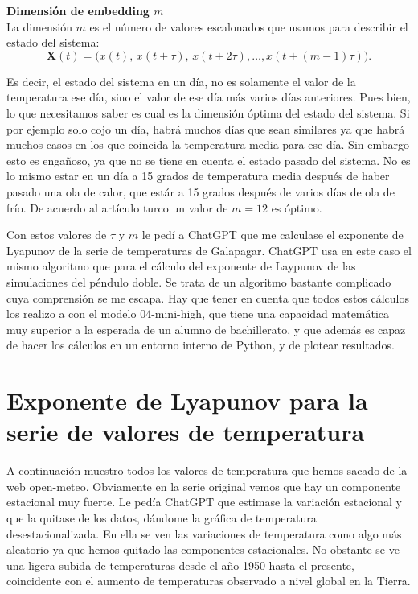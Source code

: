 \documentclass[
  10pt,
  a4paper,
  DIV=11,
  numbers=noendperiod,
  open=any]{scrreprt}
\numberwithin{equation}{chapter}
\numberwithin{equation}{chapter}
\renewcommand{\[}{\begin{equation}}
\renewcommand{\]}{\end{equation}}
\begin{document}
\textbf{Dimensión de embedding \(m\)}\\
La dimensión \(m\) es el número de valores escalonados que usamos para
describir el estado del sistema:\\
\[
\mathbf X(t)=\bigl(x(t),\,x(t+\tau),\,x(t+2\tau),\dots,x(t+(m-1)\tau)\bigr).
\]

Es decir, el estado del sistema en un día, no es solamente el valor de
la temperatura ese día, sino el valor de ese día más varios días
anteriores. Pues bien, lo que necesitamos saber es cual es la dimensión
óptima del estado del sistema. Si por ejemplo solo cojo un día, habrá
muchos días que sean similares ya que habrá muchos casos en los que
coincida la temperatura media para ese día. Sin embargo esto es
engañoso, ya que no se tiene en cuenta el estado pasado del sistema. No
es lo mismo estar en un día a 15 grados de temperatura media después de
haber pasado una ola de calor, que estár a 15 grados después de varios
días de ola de frío. De acuerdo al artículo turco un valor de \(m=12\)
es óptimo.

Con estos valores de \(\tau\) y \(m\) le pedí a ChatGPT que me calculase
el exponente de Lyapunov de la serie de temperaturas de Galapagar.
ChatGPT usa en este caso el mismo algoritmo que para el cálculo del
exponente de Laypunov de las simulaciones del péndulo doble. Se trata de
un algoritmo bastante complicado cuya comprensión se me escapa. Hay que
tener en cuenta que todos estos cálculos los realizo a con el modelo
04-mini-high, que tiene una capacidad matemática muy superior a la
esperada de un alumno de bachillerato, y que además es capaz de hacer
los cálculos en un entorno interno de Python, y de plotear resultados.

\section{Exponente de Lyapunov para la serie de valores de
temperatura}\label{exponente-de-lyapunov-para-la-serie-de-valores-de-temperatura}

A continuación muestro todos los valores de temperatura que hemos sacado
de la web open-meteo. Obviamente en la serie original vemos que hay un
componente estacional muy fuerte. Le pedía ChatGPT que estimase la
variación estacional y que la quitase de los datos, dándome la gráfica
de temperatura desestacionalizada. En ella se ven las variaciones de
temperatura como algo más aleatorio ya que hemos quitado las componentes
estacionales. No obstante se ve una ligera subida de temperaturas desde
el año 1950 hasta el presente, coincidente con el aumento de
temperaturas observado a nivel global en la Tierra.
\end{document}
